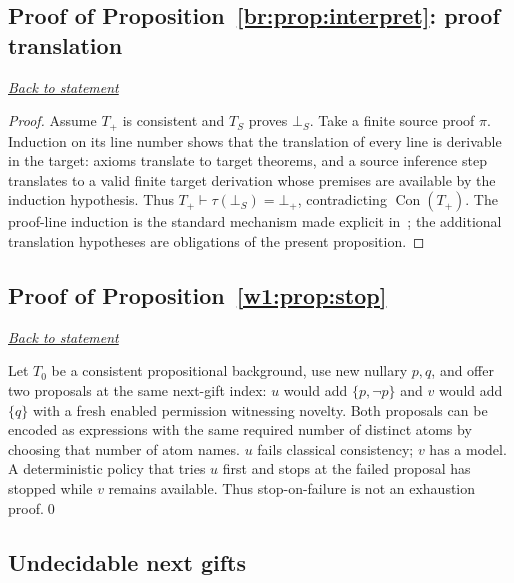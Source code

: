 \documentclass[11pt,letterpaper]{article}
\theoremstyle{definition}\newtheorem{definition}[theorem]{Definition}\newtheorem{example}[theorem]{Example}
\theoremstyle{remark}\newtheorem{remark}[theorem]{Remark}
\newcommand{\Con}{\operatorname{Con}}
\newcommand{\backlink}[1]{\noindent\hyperref[#1]{\textit{Back to statement}}\par\smallskip}
\begin{document}
\subsection{Proof of Proposition~\ref{br:prop:interpret}: proof translation}\label{br:pr:interpret}
\backlink{br:prop:interpret}
\begin{proof}
Assume $T_+$ is consistent and $T_S$ proves $\bot_S$. Take a finite
source proof $\pi$. Induction on its line number shows that the
translation of every line is derivable in the target: axioms translate
to target theorems, and a source inference step translates to a valid
finite target derivation whose premises are available by the induction
hypothesis. Thus $T_+\vdash\tau(\bot_S)=\bot_+$, contradicting
$\Con(T_+)$.  The proof-line induction is the standard mechanism
made explicit in~\cite[Theorem~1.10]{depthsv2}; the additional
translation hypotheses are obligations of the present proposition.
\end{proof}

\subsection{Proof of Proposition~\ref{w1:prop:stop}}\label{w1:pr:stop}\backlink{w1:prop:stop}
Let $T_0$ be a consistent propositional background, use new nullary $p,q$, and offer two proposals at the same next-gift index: $u$ would add $\{p,\neg p\}$ and $v$ would add $\{q\}$ with a fresh enabled permission witnessing novelty. Both proposals can be encoded as expressions with the same required number of distinct atoms by choosing that number of atom names. $u$ fails classical consistency; $v$ has a model. A deterministic policy that tries $u$ first and stops at the failed proposal has stopped while $v$ remains available. Thus stop-on-failure is not an exhaustion proof.\qed


\subsection*{Undecidable next gifts}
\end{document}
